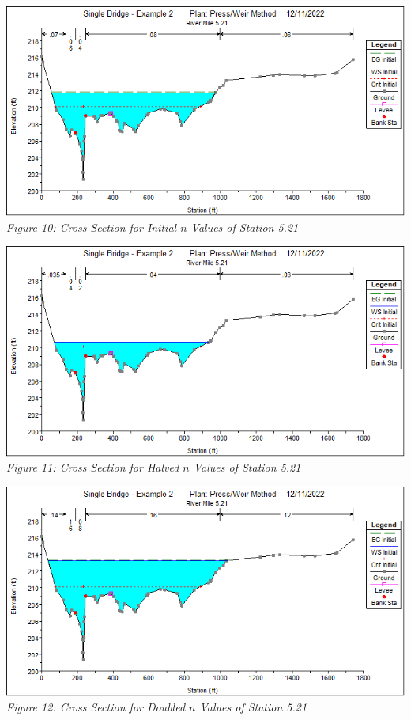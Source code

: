 \begin{center}
    \includegraphics[scale=0.7, frame]{fig10.png}
    \\\emph{Figure 10: Cross Section for Initial $n$ Values of Station 5.21}\\
    \vspace{5mm}
    \includegraphics[scale=0.7, frame]{fig11.png}
    \\\emph{Figure 11: Cross Section for Halved $n$ Values of Station 5.21}\\
    \vspace{5mm}
    \includegraphics[scale=0.7, frame]{fig12.png}
    \\\emph{Figure 12: Cross Section for Doubled $n$ Values of Station 5.21}
\end{center}

